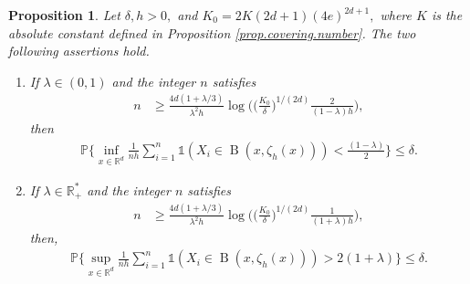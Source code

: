 \documentclass[10pt]{article}
\newcommand{\PP}{\mathbb{P}}
\newcommand{\RR}{\mathbb{R}}
\newcommand{\B}{\operatorname{B}}
\newtheorem{proposition}[theorem]{Proposition}
\begin{document}
\begin{proposition}
    \label{prop.Bernstein.general}
    Let $\delta, h > 0,$ and $K_0 = 2K(2d + 1)(4e)^{2d+1},$ where $K$ is the absolute constant defined in Proposition \ref{prop.covering.number}. The two following assertions hold.
    \begin{enumerate}
        \item [$(i)$] If $\lambda \in (0, 1)$ and the integer $n$ satisfies
            \begin{align}
                \label{eq.Bernstein.nk.condition}
                n &\geq \frac{4d(1 + \lambda/3)}{\lambda^2h}\log\bigg(\Big(\frac{K_0}{\delta}\Big)^{1/(2d)}\frac{2}{(1 - \lambda)h}\bigg),
            \end{align}
            then
            \begin{align*}
                \PP\Bigg\{\inf_{x \in \RR^d}\frac{1}{nh}\sum_{i=1}^n \mathds{1}(X_i \in \B(x, \zeta_h(x))) < \frac{(1 - \lambda)}{2}\Bigg\} \leq \delta.
            \end{align*}
        \item [$(ii)$] If $\lambda \in \RR_+^*$ and the integer $n$ satisfies
            \begin{align}
                \label{eq.Bernstein.nk.lower.condition}
                n &\geq \frac{4d(1 + \lambda/3)}{\lambda^2h}\log\bigg(\Big(\frac{K_0}{\delta}\Big)^{1/(2d)}\frac{1}{(1 + \lambda)h}\bigg),
            \end{align}
            then,
            \begin{align*}
                \PP\Bigg\{\sup_{x \in \RR^d}\frac{1}{nh}\sum_{i=1}^n \mathds{1}(X_i \in \B(x, \zeta_h(x))) > 2(1 + \lambda)\Bigg\} \leq \delta.
            \end{align*}
    \end{enumerate}
\end{proposition}
\end{document}
